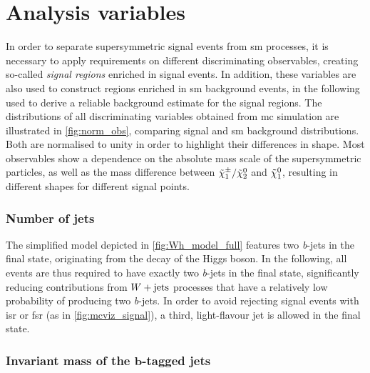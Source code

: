 \section{Analysis variables}\label{sec:variables}

In order to separate supersymmetric signal events from \gls{sm} processes, it is necessary to apply requirements on different discriminating observables, creating so-called \textit{signal regions} enriched in signal events. In addition, these variables are also used to construct regions enriched in \gls{sm} background events, in the following used to derive a reliable background estimate for the signal regions. The distributions of all discriminating variables obtained from \gls{mc} simulation are illustrated in \cref{fig:norm_obs}, comparing signal and \gls{sm} background distributions. Both are normalised to unity in order to highlight their differences in shape. Most observables show a dependence on the absolute mass scale of the supersymmetric particles, as well as the mass difference between $\tilde{\chi}_1^\pm/\tilde{\chi}_2^0$ and $\tilde{\chi}_1^0$, resulting in different shapes for different signal points. 

\subsubsection{Number of jets}

The simplified model depicted in \cref{fig:Wh_model_full} features two \textit{b}-jets in the final state, originating from the decay of the Higgs boson. In the following, all events are thus required to have exactly two \textit{b}-jets in the final state, significantly reducing contributions from \eg $W+\mathrm{jets}$ processes that have a relatively low probability of producing two \textit{b}-jets. In order to avoid rejecting signal events with \gls{isr} or \gls{fsr} (as \eg in \cref{fig:mcviz_signal}), a third, light-flavour jet is allowed in the final state.

\subsubsection[Invariant mass of the \textit{b}-tagged jets]{Invariant mass of the $\boldsymbol{b}$-tagged jets}

